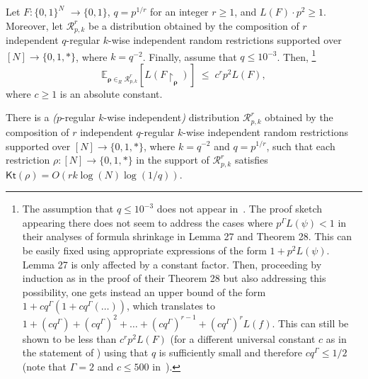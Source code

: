 \documentclass{toc}
\newcommand{\Kt}{\mathsf{Kt}}
\begin{document}
\begin{lemma} \label{l:shrinkage}
%
%
Let $F \colon \{0,1\}^N$ $\to \{0,1\}$,  %
$q = p^{1/r}$ for an integer $r \geq 1$, and $L(F) \cdot p^2 \geq 1$. Moreover, let $\mathcal{R}^r_{p,k}$ be a distribution obtained by the composition of $r$ independent $q$-regular $k$-wise independent random restrictions supported over $[N] \to \{0,1,*\}$, where $k = q^{-2}$. Finally, assume that $q \leq 10^{-3}$. Then,
\footnote{The assumption that $q \leq 10^{-3}$ does not appear in~\cite[Theorem 28]{DBLP:conf/coco/HiraharaS17}. The proof sketch appearing there does not seem to address the cases where $p^\Gamma L(\psi) < 1$ in their analyses of formula shrinkage in Lemma 27 and Theorem 28. This can be easily fixed using appropriate expressions of the form $1 + p^2 L(\psi)$. Lemma 27 is only affected by a constant factor. Then, proceeding by induction as in the proof of their Theorem 28 but also addressing this possibility, one gets instead an upper bound of the form $1 + cq^\Gamma(1 + cq^\Gamma (\ldots))$, which translates to $1 + (cq^\Gamma) + (cq^\Gamma)^2 + \ldots + (cq^\Gamma)^{r - 1} + (cq^\Gamma)^r L(f)$.
%
This can still be shown to be less than  %
$c^r p^2 L(F)$ (for a different universal constant $c$ as in the statement of ) using that $q$ is sufficiently small and therefore $cq^\Gamma \leq 1/2$ (note that $\Gamma = 2$ and $c \leq 500$ in~\cite{DBLP:conf/coco/HiraharaS17}).}
$$
\mathbb{E}_{\bm{\rho} \in_R \mathcal{R}^r_{p,k}}[L(F\!\upharpoonright_{\bm{\rho}})] \; \leq \; c^r p^2 L(F),
$$
where $c \geq 1$ is an absolute constant.
\end{lemma}



\begin{proposition}\label{p:composed_restriction_kt}
There is a \emph{(}$p$-regular $k$-wise independent\emph{)} distribution $\mathcal{R}^r_{p,k}$ obtained by the composition of $r$ independent $q$-regular $k$-wise independent random restrictions supported over $[N] \to \{0,1,*\}$, where $k = q^{-2}$ and $q = p^{1/r}$, such that each  restriction $\rho \colon [N] \to \{0,1,*\}$ in the support of $\mathcal{R}^r_{p,k}$ satisfies $\Kt(\rho) = O(r k \log (N) \log (1/q))$. 
\end{proposition}
\end{document}
